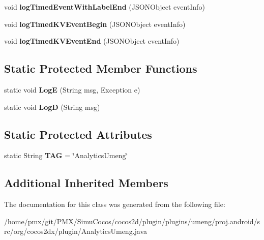 \begin{DoxyCompactItemize}
void {\bfseries log\+Timed\+Event\+With\+Label\+End} (J\+S\+O\+N\+Object event\+Info)
\item 
\mbox{\label{classorg_1_1cocos2dx_1_1plugin_1_1AnalyticsUmeng_a6fc50ee09f1e3664ffc4559dc5922ccb}} 
void {\bfseries log\+Timed\+K\+V\+Event\+Begin} (J\+S\+O\+N\+Object event\+Info)
\item 
\mbox{\label{classorg_1_1cocos2dx_1_1plugin_1_1AnalyticsUmeng_a771a103945ec79c80482c196e30affe8}} 
void {\bfseries log\+Timed\+K\+V\+Event\+End} (J\+S\+O\+N\+Object event\+Info)
\end{DoxyCompactItemize}
\subsection*{Static Protected Member Functions}
\begin{DoxyCompactItemize}
\item 
\mbox{\label{classorg_1_1cocos2dx_1_1plugin_1_1AnalyticsUmeng_a22a08896d5e40229fd8e81cb53bc329b}} 
static void {\bfseries LogE} (String msg, Exception e)
\item 
\mbox{\label{classorg_1_1cocos2dx_1_1plugin_1_1AnalyticsUmeng_a6172f094c9f6923158ecd74e983506af}} 
static void {\bfseries LogD} (String msg)
\end{DoxyCompactItemize}
\subsection*{Static Protected Attributes}
\begin{DoxyCompactItemize}
\item 
\mbox{\label{classorg_1_1cocos2dx_1_1plugin_1_1AnalyticsUmeng_a3e632d3616496b1c33cfdebc42503767}} 
static String {\bfseries T\+AG} = \char`\"{}Analytics\+Umeng\char`\"{}
\end{DoxyCompactItemize}
\subsection*{Additional Inherited Members}


The documentation for this class was generated from the following file\+:\begin{DoxyCompactItemize}
\item 
/home/pmx/git/\+P\+M\+X/\+Simu\+Cocos/cocos2d/plugin/plugins/umeng/proj.\+android/src/org/cocos2dx/plugin/Analytics\+Umeng.\+java\end{DoxyCompactItemize}

